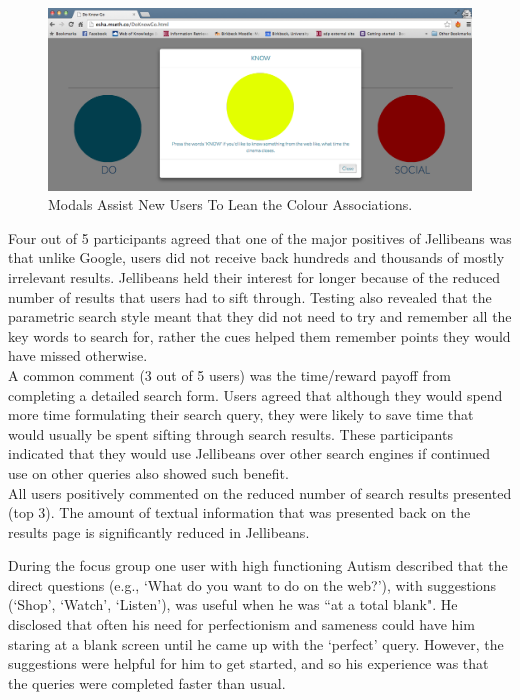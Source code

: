 \documentclass[a4paper, 11pt]{article}
\begin{document}
\begin{figure}[H]
\begin{center}
\includegraphics[scale=0.25]{floatingModals}
\caption{Modals Assist New Users To Lean the Colour Associations.}
\label{colourCoding}
\end{center}
\end{figure}


Four out of 5 participants agreed that one of the major positives of Jellibeans was that unlike Google, users did not receive back hundreds and thousands of mostly irrelevant results. Jellibeans held their interest for longer because of the reduced number of results that users had to sift through. Testing also revealed that the parametric search style meant that they did not need to try and remember all the key words to search for, rather the cues helped them remember points they would have missed otherwise. \\

\vspace{5mm}
A common comment (3 out of 5 users) was the time/reward payoff from completing a detailed search form. Users agreed that although they would spend more time formulating their search query, they were likely to save time that would usually be spent sifting through search results. These participants indicated that they would use Jellibeans over other search engines if continued use on other queries also showed such benefit.\\

\vspace{5mm}
All users positively commented on the reduced number of search results presented (top 3). The amount of textual information that was presented back on the results page is significantly reduced in Jellibeans. 

\vspace{5mm}
During the focus group one user with high functioning Autism described that the direct questions (e.g., `What do you want to do on the web?'), with suggestions (`Shop', `Watch', `Listen'), was useful when he was ``at a total blank". He disclosed that often his need for perfectionism and sameness could have him staring at a blank screen until he came up with the `perfect' query. However, the suggestions were helpful for him to get started, and so his experience was that the queries were completed faster than usual.  \\
\end{document}
